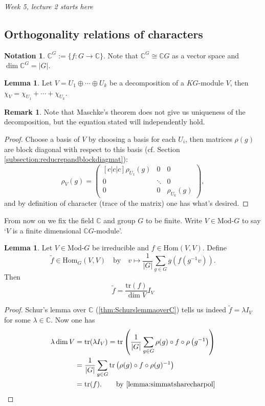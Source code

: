 \documentclass[a4paper]{article}
\newcommand{\tr}{\text{tr}}
\newcommand{\C}{\mathbb{C}}
\newcommand{\Hom}{\text{Hom}}
\newcommand{\Mod}{\text{Mod-}}
\theoremstyle{definition}
\newtheorem{lemma}[defn]{Lemma}
\newtheorem*{remark}{Remark}
\newtheorem*{notation}{Notation}
\begin{document}
\begin{flushright}
\textit{Week 5, lecture 2 starts here}
\end{flushright}

\subsection{Orthogonality relations of characters}
\begin{notation}
$\C^G:=\{f:G\rightarrow\C\}$. Note that $\C^G\cong \C G$ as a vector space and $\dim \C^G=|G|$.
\end{notation}

\begin{lemma}
\label{lemma:charofsumissumofchar}
Let $V=U_1\oplus\cdots\oplus U_k$ be a decomposition of a $KG$-module $V$, then $\chi_{V}=\chi_{U_1}+\cdots+\chi_{U_k}$.
\end{lemma}
\begin{remark}
Note that Maschke's theorem does not give us uniqueness of the decomposition, but the equation stated will independently hold.
\end{remark}
\begin{proof}
Choose a basis of $V$ by choosing a basis for each $U_i$, then matrices $\rho(g)$ are block diagonal with respect to this basis (cf. Section \ref{subsection:reducrepandblockdiagmat}):
\[
\rho_V(g)=\begin{pmatrix}[c|c|c]
\rho_{U_1}(g) & 0 & 0 \\ \hline
0 & \ddots & 0 \\ \hline
0 & 0 & \rho_{U_k}(g)
\end{pmatrix},
\]
and by definition of character (trace of the matrix) one has what's desired.
\end{proof}

From now on we fix the field $\C$ and group $G$ to be finite. Write $V\in\Mod G$ to say `$V$ is a finite dimensional $\C G$-module'.

\begin{lemma}
\label{lemma:ftildeistrfoverdimVIV}
Let $V\in\Mod G$ be irreducible and $f\in\Hom(V,V)$. Define
\[
\widetilde f\in\Hom_G(V,V)\quad\text{by}\quad v\mapsto \frac{1}{|G|}\sum_{g\in G}g\left(f\left(g^{-1}v\right)\right).
\]
Then
\[
\widetilde f=\frac{\tr(f)}{\dim V} I_V
\]
\end{lemma}
\begin{proof}
Schur's lemma over $\C$ (\ref{thm:SchurslemmaoverC}) tells us indeed $\widetilde f=\lambda I_V$ for some $\lambda\in\C$. Now one has
\[
\begin{aligned}
\lambda\dim V&=\tr(\lambda I_V)=\tr\left(\frac{1}{|G|}\sum_{g\in G}\rho(g)\circ f\circ \rho\left(g^{-1}\right)\right)\\
&=\frac{1}{|G|}\sum_{g\in G}\tr\left(\rho(g)\circ f\circ \rho(g)^{-1}\right)\\
&=\tr(f). \qquad \text{by \ref{lemma:simmatsharecharpol}}
\end{aligned}
\]
\end{proof}
\end{document}
